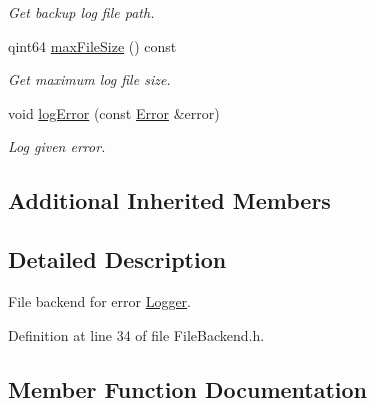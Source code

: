 \begin{DoxyCompactItemize}
\begin{DoxyCompactList}\small\item\em Get backup log file path. \end{DoxyCompactList}\item 
qint64 \hyperlink{class_mdt_1_1_error_logger_1_1_file_backend_a8c5943cdd59ed5941c72490d7b414359}{max\+File\+Size} () const \hypertarget{class_mdt_1_1_error_logger_1_1_file_backend_a8c5943cdd59ed5941c72490d7b414359}{}\label{class_mdt_1_1_error_logger_1_1_file_backend_a8c5943cdd59ed5941c72490d7b414359}

\begin{DoxyCompactList}\small\item\em Get maximum log file size. \end{DoxyCompactList}\item 
void \hyperlink{class_mdt_1_1_error_logger_1_1_file_backend_a31b8314d523a491b5441276122daed87}{log\+Error} (const \hyperlink{class_mdt_1_1_error}{Error} \&error)\hypertarget{class_mdt_1_1_error_logger_1_1_file_backend_a31b8314d523a491b5441276122daed87}{}\label{class_mdt_1_1_error_logger_1_1_file_backend_a31b8314d523a491b5441276122daed87}

\begin{DoxyCompactList}\small\item\em Log given error. \end{DoxyCompactList}\end{DoxyCompactItemize}
\subsection*{Additional Inherited Members}


\subsection{Detailed Description}
File backend for error \hyperlink{class_mdt_1_1_error_logger_1_1_logger}{Logger}. 

Definition at line 34 of file File\+Backend.\+h.



\subsection{Member Function Documentation}
